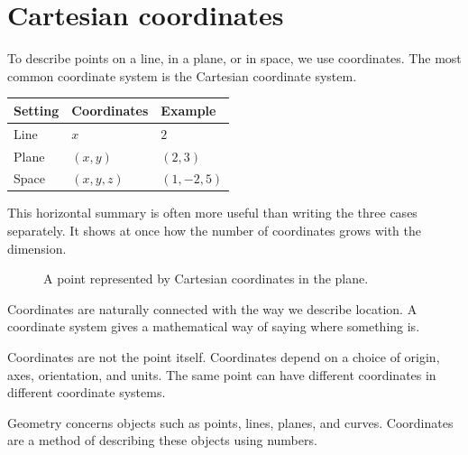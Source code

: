 \section{Cartesian coordinates}

To describe points on a line, in a plane, or in space, we use coordinates. The most common coordinate system is the Cartesian coordinate system.

\begin{center}
\begin{tabular}{@{}lll@{}}
\toprule
Setting & Coordinates & Example \\
\midrule
Line & \(x\) & \(2\) \\
Plane & \((x,y)\) & \((2,3)\) \\
Space & \((x,y,z)\) & \((1,-2,5)\) \\
\bottomrule
\end{tabular}
\end{center}

This horizontal summary is often more useful than writing the three cases separately. It shows at once how the number of coordinates grows with the dimension.

\begin{figure}[htbp]
\centering

\caption{A point represented by Cartesian coordinates in the plane.}
\label{fig:mathematical-foundations-cartesian-point}
\end{figure}

Coordinates are naturally connected with the way we describe location. A coordinate system gives a mathematical way of saying where something is.

\begin{remarkbox}
Coordinates are not the point itself. Coordinates depend on a choice of origin, axes, orientation, and units. The same point can have different coordinates in different coordinate systems.
\end{remarkbox}

Geometry concerns objects such as points, lines, planes, and curves. Coordinates are a method of describing these objects using numbers.
